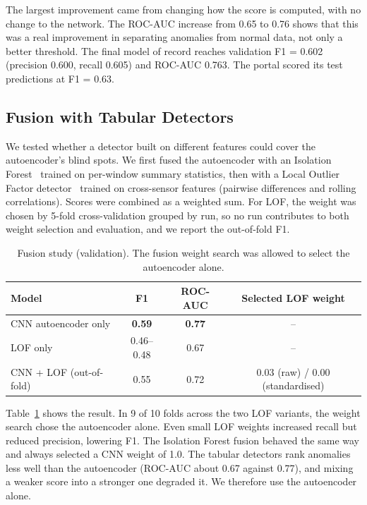 \documentclass[runningheads]{llncs}
\begin{document}
The largest improvement came from changing how the score is computed, with no change to the network. The ROC-AUC increase from 0.65 to 0.76 shows that this was a real improvement in separating anomalies from normal data, not only a better threshold. The final model of record reaches validation F1 = 0.602 (precision 0.600, recall 0.605) and ROC-AUC 0.763. The portal scored its test predictions at F1 = 0.63.

\subsection{Fusion with Tabular Detectors}

We tested whether a detector built on different features could cover the autoencoder's blind spots. We first fused the autoencoder with an Isolation Forest~\cite{liu2008isolation} trained on per-window summary statistics, then with a Local Outlier Factor detector~\cite{breunig2000lof} trained on cross-sensor features (pairwise differences and rolling correlations). Scores were combined as a weighted sum. For LOF, the weight was chosen by 5-fold cross-validation grouped by run, so no run contributes to both weight selection and evaluation, and we report the out-of-fold F1.

\begin{table}[t]
\centering
\caption{Fusion study (validation). The fusion weight search was allowed to select the autoencoder alone.}\label{tab:fusion}
\begin{tabular}{lccc}
\toprule
Model & F1 & ROC-AUC & Selected LOF weight \\
\midrule
CNN autoencoder only & \textbf{0.59} & \textbf{0.77} & -- \\
LOF only & 0.46--0.48 & 0.67 & -- \\
CNN + LOF (out-of-fold) & 0.55 & 0.72 & 0.03 (raw) / 0.00 (standardised) \\
\bottomrule
\end{tabular}
\end{table}

Table~\ref{tab:fusion} shows the result. In 9 of 10 folds across the two LOF variants, the weight search chose the autoencoder alone. Even small LOF weights increased recall but reduced precision, lowering F1. The Isolation Forest fusion behaved the same way and always selected a CNN weight of 1.0. The tabular detectors rank anomalies less well than the autoencoder (ROC-AUC about 0.67 against 0.77), and mixing a weaker score into a stronger one degraded it. We therefore use the autoencoder alone.
\end{document}
